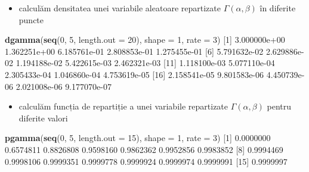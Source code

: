 \documentclass[]{article}
\newenvironment{Shaded}{\begin{snugshade}}{\end{snugshade}}
\newcommand{\KeywordTok}[1]{\textcolor[rgb]{0.13,0.29,0.53}{\textbf{#1}}}
\newcommand{\DataTypeTok}[1]{\textcolor[rgb]{0.13,0.29,0.53}{#1}}
\newcommand{\DecValTok}[1]{\textcolor[rgb]{0.00,0.00,0.81}{#1}}
\newcommand{\FloatTok}[1]{\textcolor[rgb]{0.00,0.00,0.81}{#1}}
\newcommand{\NormalTok}[1]{#1}
\providecommand{\tightlist}{%
  \setlength{\itemsep}{0pt}\setlength{\parskip}{0pt}}
\begin{document}
\begin{itemize}
\tightlist
\item
  calculăm densitatea unei variabile aleatoare repartizate
  \(\Gamma(\alpha, \beta)\) în diferite puncte
\end{itemize}

\begin{Shaded}
\begin{Highlighting}[]
\KeywordTok{dgamma}\NormalTok{(}\KeywordTok{seq}\NormalTok{(}\DecValTok{0}\NormalTok{, }\DecValTok{5}\NormalTok{, }\DataTypeTok{length.out =} \DecValTok{20}\NormalTok{), }\DataTypeTok{shape =} \DecValTok{1}\NormalTok{, }\DataTypeTok{rate =} \DecValTok{3}\NormalTok{)}
\NormalTok{ [}\DecValTok{1}\NormalTok{] }\FloatTok{3.000000e+00} \FloatTok{1.362251e+00} \FloatTok{6.185761e-01} \FloatTok{2.808853e-01} \FloatTok{1.275455e-01}
\NormalTok{ [}\DecValTok{6}\NormalTok{] }\FloatTok{5.791632e-02} \FloatTok{2.629886e-02} \FloatTok{1.194188e-02} \FloatTok{5.422615e-03} \FloatTok{2.462321e-03}
\NormalTok{[}\DecValTok{11}\NormalTok{] }\FloatTok{1.118100e-03} \FloatTok{5.077110e-04} \FloatTok{2.305433e-04} \FloatTok{1.046860e-04} \FloatTok{4.753619e-05}
\NormalTok{[}\DecValTok{16}\NormalTok{] }\FloatTok{2.158541e-05} \FloatTok{9.801583e-06} \FloatTok{4.450739e-06} \FloatTok{2.021008e-06} \FloatTok{9.177070e-07}
\end{Highlighting}
\end{Shaded}

\begin{itemize}
\tightlist
\item
  calculăm funcția de repartiție a unei variabile repartizate
  \(\Gamma(\alpha, \beta)\) pentru diferite valori
\end{itemize}

\begin{Shaded}
\begin{Highlighting}[]
\KeywordTok{pgamma}\NormalTok{(}\KeywordTok{seq}\NormalTok{(}\DecValTok{0}\NormalTok{, }\DecValTok{5}\NormalTok{, }\DataTypeTok{length.out =} \DecValTok{15}\NormalTok{), }\DataTypeTok{shape =} \DecValTok{1}\NormalTok{, }\DataTypeTok{rate =} \DecValTok{3}\NormalTok{)}
\NormalTok{ [}\DecValTok{1}\NormalTok{] }\FloatTok{0.0000000} \FloatTok{0.6574811} \FloatTok{0.8826808} \FloatTok{0.9598160} \FloatTok{0.9862362} \FloatTok{0.9952856} \FloatTok{0.9983852}
\NormalTok{ [}\DecValTok{8}\NormalTok{] }\FloatTok{0.9994469} \FloatTok{0.9998106} \FloatTok{0.9999351} \FloatTok{0.9999778} \FloatTok{0.9999924} \FloatTok{0.9999974} \FloatTok{0.9999991}
\NormalTok{[}\DecValTok{15}\NormalTok{] }\FloatTok{0.9999997}
\end{Highlighting}
\end{Shaded}
\end{document}

